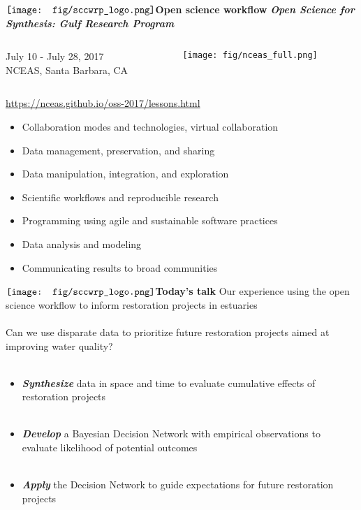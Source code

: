 \documentclass[serif]{beamer}\usepackage[]{graphicx}\usepackage[]{color}
\newcommand{\emtxt}[1]{\textbf{\textit{{\color{mypal4} #1}}}}
\begin{document}
\begin{frame}{{$\vcenter{\hbox{\texttt{[image: fig/sccwrp\_logo.png]}}}$\hspace{0.07in}\textbf{Open science workflow}}}
{\large \emtxt{Open Science for Synthesis: Gulf Research Program}}
\begin{columns}
\begin{column}{0.5\textwidth}
July 10 - July 28, 2017\\
NCEAS, Santa Barbara, CA 
\end{column}
\begin{column}{0.5\textwidth}
\hfill \texttt{[image: fig/nceas\_full.png]}
\end{column}
\end{columns}
\vspace{0.1in}
\vfill
\centerline{\url{https://nceas.github.io/oss-2017/lessons.html}}
\begin{itemize}
\item Collaboration modes and technologies, virtual collaboration
\item Data management, preservation, and sharing
\item Data manipulation, integration, and exploration
\item Scientific workflows and reproducible research
\item Programming using agile and sustainable software practices
\item Data analysis and modeling
\item Communicating results to broad communities
\end{itemize}
\vfill
\end{frame}

\begin{frame}{{$\vcenter{\hbox{\texttt{[image: fig/sccwrp\_logo.png]}}}$\hspace{0.07in}\textbf{Today's talk}}}
\onslide<+->
Our experience using the open science workflow to inform restoration projects in estuaries \\~\\
\onslide<+->
Can we use disparate data to prioritize future restoration projects aimed at improving water quality? \\~\\
\begin{itemize}
\item<+-> \emtxt{Synthesize} data in space and time to evaluate cumulative effects of restoration projects\\~\\
\item<+-> \emtxt{Develop} a Bayesian Decision Network with empirical observations to evaluate likelihood of potential outcomes \\~\\
\item<+-> \emtxt{Apply} the Decision Network to guide expectations for future restoration projects
\end{itemize}
\end{frame}
\end{document}
